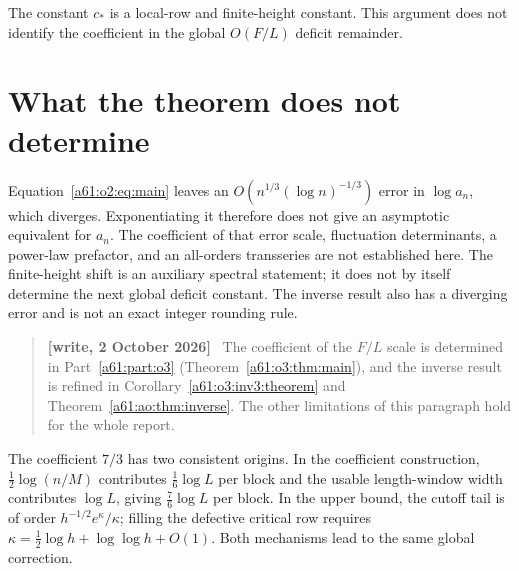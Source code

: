 \documentclass[11pt,letterpaper]{article}
\numberwithin{equation}{section}
\theoremstyle{remark}\newtheorem{remark}[theorem]{Remark}
\newenvironment{writenote}{\par\smallskip\begin{quote}\small\textbf{[write, 2 October 2026]}\ }{\end{quote}\smallskip}
\begin{document}
The constant $c_*$ is a local-row and finite-height constant.
This argument does not identify the coefficient in the global
$O(F/L)$ deficit remainder.



\section{What the theorem does not determine}
Equation~\eqref{a61:o2:eq:main} leaves an $O(n^{1/3}(\log n)^{-1/3})$ error in $\log a_n$, which diverges. Exponentiating it therefore does not give an asymptotic equivalent for $a_n$. The coefficient of that error scale, fluctuation determinants, a power-law prefactor, and an all-orders transseries are not established here. The finite-height shift is an auxiliary spectral statement; it does not by itself determine the next global deficit constant. The inverse result also has a diverging error and is not an exact integer rounding rule.
\begin{writenote}
The coefficient of the $F/L$ scale is determined in Part~\ref{a61:part:o3} (Theorem~\ref{a61:o3:thm:main}), and the inverse result is refined in Corollary~\ref{a61:o3:inv3:theorem} and Theorem~\ref{a61:ao:thm:inverse}. The other limitations of this paragraph hold for the whole report.
\end{writenote}


The coefficient $7/3$ has two consistent origins. In the coefficient construction, $\tfrac12\log(n/M)$ contributes $\tfrac16\log L$ per block and the usable length-window width contributes $\log L$, giving $\tfrac76\log L$ per block. In the upper bound, the cutoff tail is of order $h^{-1/2}e^\kappa/\kappa$; filling the defective critical row requires $\kappa=\tfrac12\log h+\log\log h+O(1)$. Both mechanisms lead to the same global correction.
\end{document}
